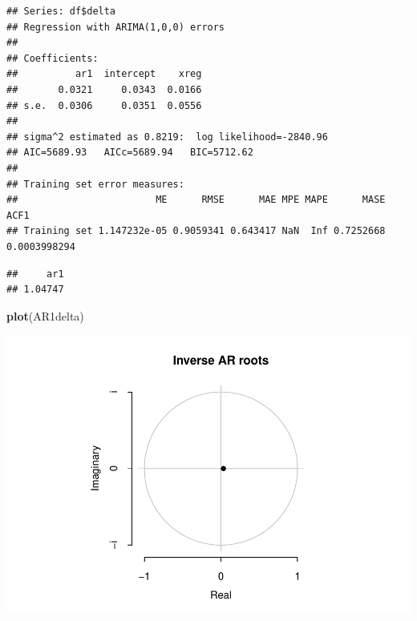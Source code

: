 \documentclass[11pt, a4paper]{report}
\newenvironment{Shaded}{\begin{snugshade}}{\end{snugshade}}
\newcommand{\DecValTok}[1]{\textcolor[rgb]{0.00,0.00,0.81}{#1}}
\newcommand{\KeywordTok}[1]{\textcolor[rgb]{0.13,0.29,0.53}{\textbf{#1}}}
\newcommand{\NormalTok}[1]{#1}
\newcommand{\OperatorTok}[1]{\textcolor[rgb]{0.81,0.36,0.00}{\textbf{#1}}}
\theoremstyle{plain}
\theoremstyle{plain}
\theoremstyle{remark}
\begin{document}
\begin{verbatim}
## Series: df$delta 
## Regression with ARIMA(1,0,0) errors 
## 
## Coefficients:
##          ar1  intercept    xreg
##       0.0321     0.0343  0.0166
## s.e.  0.0306     0.0351  0.0556
## 
## sigma^2 estimated as 0.8219:  log likelihood=-2840.96
## AIC=5689.93   AICc=5689.94   BIC=5712.62
## 
## Training set error measures:
##                        ME      RMSE      MAE MPE MAPE      MASE         ACF1
## Training set 1.147232e-05 0.9059341 0.643417 NaN  Inf 0.7252668 0.0003998294
\end{verbatim}

\begin{Shaded}
\end{Shaded}

\begin{verbatim}
##     ar1 
## 1.04747
\end{verbatim}

\begin{Shaded}
\begin{Highlighting}[]
\KeywordTok{plot}\NormalTok{(AR1delta)}
\end{Highlighting}
\end{Shaded}

\begin{center}\includegraphics{Econo2_P1_files/figure-latex/delta 1-1} \end{center}
\end{document}
